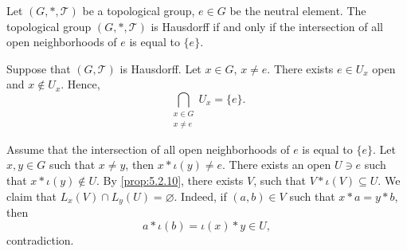 \begin{propositionenv}
    Let $(G,*,\mathscr{T})$ be a topological group,
    $e \in G$ be the neutral element.
    The topological group $(G,*,\mathscr{T})$ is Hausdorff if and only if the intersection of all open neighborhoods of $e$ is equal to $\{e\}$.
\end{propositionenv}
\begin{proofenv}
    Suppose that $(G,\mathscr{T})$ is Hausdorff.
    Let $x \in G$, $x \neq e$.
    There exists $e \in U_x$ open and $x \notin U_x$.
    Hence,
    $$ \bigcap_{\substack{x \in G\\ x \neq e}} U_x = \{e\}.$$

    \quad Assume that the intersection of all open neighborhoods of $e$ is equal to $\{e\}$.
    Let $x, y\in G$ such that $x \neq y$, then $x * \iota(y) \neq e$.
    There exists an open $U \ni e$ such that $x * \iota(y) \notin U$.
    By \ref{prop:5.2.10}, there exists $V$, such that $V * \iota(V) \subseteq U$.
    We claim that $L_{x} (V) \cap L_{y}(U) = \varnothing$.
    Indeed, if $(a,b) \in V$ such that $x * a = y * b$, then
    $$a * \iota(b) = \iota(x) * y \in U,$$
    contradiction.
\end{proofenv}

